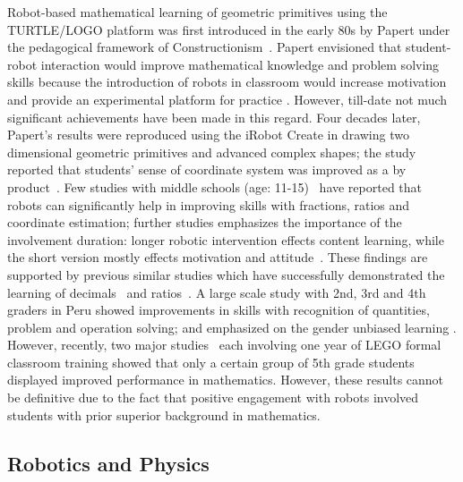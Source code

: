 \documentclass[conference]{IEEEtran}
\begin{document}
Robot-based mathematical learning of geometric primitives using the TURTLE/LOGO platform was first introduced in the 
early 80s by Papert under the pedagogical framework of Constructionism~\cite{papert1980mindstorms}. Papert envisioned 
that student-robot interaction would improve mathematical knowledge and problem solving skills because the introduction 
of robots in classroom would increase motivation and provide an experimental platform for practice 
\cite{portsmore2004bringing, ruiz2004robotics, robinson2005robotics}. However, till-date not much significant 
achievements have been made in this regard. Four decades later, Papert's results were reproduced using the 
iRobot Create in drawing two dimensional geometric primitives and advanced complex shapes; the study reported that 
students' sense of coordinate system was improved as a by product~\cite{walker2012user}. Few studies with 
middle schools (age: 11-15)~\cite{nugent2008effect, nugent2009use} have reported that robots can significantly help 
in improving skills with fractions, ratios and coordinate estimation; further studies emphasizes the importance of 
the involvement duration: longer robotic intervention effects content learning, while the short version mostly 
effects motivation and attitude~\cite{nugent2010impact}. These findings are supported by previous similar studies which 
have successfully demonstrated the learning of decimals~\cite{portsmore2004bringing} and ratios~\cite{norton2004using, 
barker2007robotics}. A large scale study with 2nd, 3rd and 4th graders in Peru showed improvements in skills with 
recognition of quantities, problem and operation solving; and emphasized on the gender unbiased learning 
\cite{iturrizaga2000study}. However, recently, two major studies~\cite{hussain2006effect, lindh2007does} each involving 
one year of LEGO formal classroom training showed that only a certain group of 5th grade students displayed improved 
performance in mathematics. However, these results cannot be definitive due to the fact that positive engagement with 
robots involved students with prior superior background in mathematics.


\subsection{Robotics and Physics}
\end{document}
